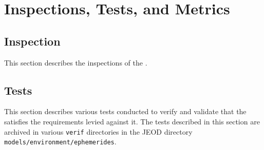 %
% 

\chapter{Inspections, Tests, and Metrics}
\label{ch:ivv}

\section{Inspection}\label{sec:inspect}
This section describes the inspections of the \ModelDesc.



\newpage
\section{Tests}\label{sec:tests}
This section describes various tests conducted to verify and validate
that the \ModelDesc satisfies the requirements levied against it.
The tests described in this section are archived in various {\tt verif} directories in the JEOD directory \verb+models/environment/ephemerides+.





\newpage
\boilerplatetraceability

\newpage
\boilerplatemetrics
